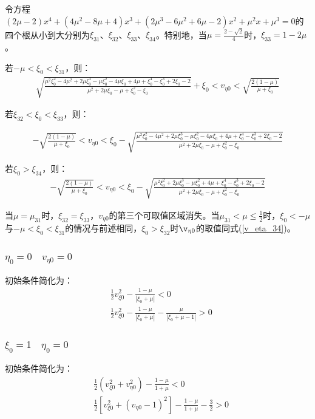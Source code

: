 令方程$ (2 \mu -2)x^4+ \left(4 \mu ^2-8 \mu +4\right)x^3+ \left(2 \mu ^3-6 \mu ^2+6 \mu -2\right)x^2+\mu ^2x+\mu ^3=0$的四个根从小到大分别为$\xi_{31}$、$\xi_{32}$、$\xi_{33}$、$\xi_{34}$。特别地，当$\mu=\frac{2-\sqrt{2}}{4}$时，$\xi_{33}=1-2\mu$。

若$-\mu<\xi _0<\xi_{31}$，则：
\begin{align}
    \sqrt{\frac{\mu ^2 \xi _0^2-4 \mu ^2+2 \mu  \xi _0^3-\mu  \xi _0^2-4 \mu  \xi _0+4 \mu +\xi _0^4-\xi _0^3+2 \xi _0-2}{\mu ^2+2 \mu  \xi _0-\mu +\xi _0^2-\xi _0}}+\xi _0<v_{\text{$\eta $0}}<\sqrt{\frac{2(1-\mu)}{\mu +\xi _0}}
\end{align}

若$\xi_{32}<\xi _0<\xi_{33}$，则：

\begin{align}
    - \sqrt{\frac{2(1-\mu)}{\mu +\xi _0}}<v_{\text{$\eta $0}}<\xi _0-\sqrt{\frac{\mu ^2 \xi _0^2-4 \mu ^2+2 \mu  \xi _0^3-\mu  \xi _0^2-4 \mu  \xi _0+4 \mu +\xi _0^4-\xi _0^3+2 \xi _0-2}{\mu ^2+2 \mu  \xi _0-\mu +\xi _0^2-\xi _0}}
\end{align}

若$\xi _0>\xi_{34}$，则：
\begin{align}
    -\sqrt{\frac{2(1-\mu)}{\mu +\xi _0}}<v_{\text{$\eta $0}}<\xi _0-\sqrt{\frac{\mu ^2 \xi _0^2+2 \mu  \xi _0^3-\mu  \xi _0^2+4 \mu +\xi _0^4-\xi _0^3+2 \xi _0-2}{\mu ^2+2 \mu  \xi _0-\mu +\xi _0^2-\xi _0}}\label{v_eta_34}
\end{align}

当$\mu=\mu_{31}$时，$\xi_{32}=\xi_{33}$，$v_{\eta0}$的第三个可取值区域消失。当$\mu_{31}<\mu\leq\frac{1}{2}$时，$\xi _0<-\mu$与$-\mu<\xi_0<\xi_{31}$的情况与前述相同，$\xi_0>\xi_{32}$时$\v_{\eta0}$的取值同式(\ref{v_eta_34})。

\subsubsection{$\eta_0=0\quad v_{\eta0}=0$}

初始条件简化为：
\begin{align}
    &\frac{1}{2}v_{\xi0}^2-\frac{1-\mu}{|\xi_0+\mu|}<0
    \\&\frac{1}{2}v_{\xi0}^2-\frac{1-\mu}{|\xi_0+\mu|}-\frac{\mu}{|\xi_0+\mu-1|}>0
\end{align}

\subsubsection{$\xi_0=1\quad\eta_0=0$}

初始条件简化为：
\begin{align}
    &\frac{1}{2}\left(v_{\xi0}^2+v_{\eta0}^2\right)-\frac{1-\mu}{1+\mu}<0
    \\&\frac{1}{2}\left[v_{\xi0}^2+(v_{\eta0}-1)^2\right]-\frac{1-\mu}{1+\mu}-\frac{3}{2}>0
\end{align}